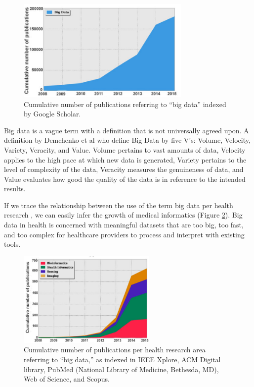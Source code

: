 \begin{figure}[h!]
    \center
    \includegraphics[width=0.75\textwidth]{images/chapter1/publication_big_data.PNG}
    \caption{Cumulative number of publications referring to “big data” indexed by Google Scholar.}
    \label{fig:bigDataGoogleScholar}
  \end{figure}
 
Big data is a vague term with a definition that is not universally agreed upon. A definition by Demchenko et al\cite{demchenko2012addressing} who define Big Data by five V’s: Volume, Velocity, Variety, Veracity, and Value. Volume pertains to vast amounts of data, Velocity applies to the high pace at which new data is generated, Variety pertains to the level of complexity of the data, Veracity measures the genuineness of data, and Value evaluates how good the quality of the data is in reference to the intended results.


If we trace the relationship between the use of the term big data per health research , we can easily infer the growth of medical informatics (Figure \ref{fig:bigDataHealthResearch}). Big data in health is concerned with meaningful datasets that are too big, too fast, and too complex for healthcare providers to process and interpret with existing tools\cite{andreu2015big}.
\begin{figure}[h!]
    \center
    \includegraphics[width=0.60\textwidth]{images/chapter1/health_publication_bigData.PNG}
    \caption{Cumulative number of publications per health research
    area referring to “big data,” as indexed in IEEE Xplore, ACM Digital library, PubMed (National Library of Medicine, Bethesda, MD), Web of Science, and Scopus.}
    \label{fig:bigDataHealthResearch}
  \end{figure}


